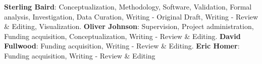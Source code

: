 \textbf{Sterling Baird}: Conceptualization, Methodology, Software, Validation, Formal analysis, Investigation, Data Curation, Writing - Original Draft, Writing - Review \& Editing, Visualization. \textbf{Oliver Johnson}: Supervision, Project administration, Funding acquisition, Conceptualization, Writing - Review \& Editing. \textbf{David Fullwood}: Funding acquisition, Writing - Review \& Editing. \textbf{Eric Homer}: Funding acquisition, Writing - Review \& Editing
